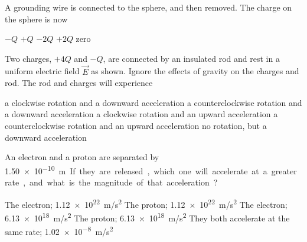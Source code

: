 \documentclass{../../oss-classkick-exam}
\begin{document}
\begin{questions}
\begin{multicols*}{2}
    \question A grounding wire is connected to the sphere, and then removed. The
    charge on the sphere is now
    \begin{choices}
      \choice $-Q$
      \choice $+Q$
      \choice $-2Q$
      \choice $+2Q$
      \choice zero
    \end{choices}
    \label{cond2}
  
    \question Two charges, $+4Q$ and $-Q$, are connected by an insulated rod and
    rest in a uniform electric field $\vec E$ as shown. Ignore the effects of
    gravity on the charges and rod. The rod and charges will experience
    \begin{choices}
      \choice a clockwise rotation and a downward acceleration
      \choice a counterclockwise rotation and a downward acceleration
      \choice a clockwise rotation and an upward acceleration
      \choice a counterclockwise rotation and an upward acceleration
      \choice no rotation, but a downward acceleration
    \end{choices}
    \vspace{.7in}
  
    \question An electron and a proton are separated by \SI{1.50e-10}\metre. If
    they are released, which one will accelerate at a greater rate, and what is
    the magnitude of that acceleration?
    \begin{choices}
      \choice The electron; \SI{1.12e22}{m/s^2}
      \choice The proton; \SI{1.12e22}{m/s^2}
      \choice The electron; \SI{6.13e18}{m/s^2}
      \choice The proton; \SI{6.13e18}{m/s^2}
      \choice They both accelerate at the same rate; \SI{1.02e-8}{m/s^2}
    \end{choices}
    \columnbreak
  

\end{multicols*}
\end{questions}
\end{document}
